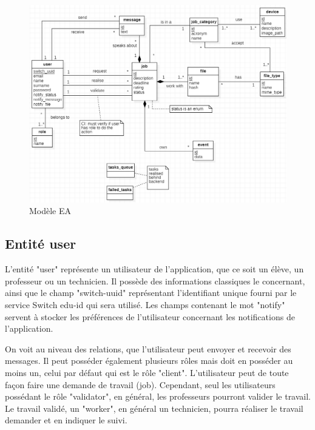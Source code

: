 \documentclass[
    iai, %
    il, %
]{heig-tb}
\begin{document}
\begin{center}
    \begin{figure}
        \includegraphics[width=\textwidth]{./assets/figures/ea.png}
        \caption{Modèle EA \label{ea}}
    \end{figure}
\end{center}

\subsection{Entité user}
L'entité "user" représente un utilisateur de l'application, que ce soit un élève, un professeur ou un technicien.\newline
Il possède des informations classiques le concernant, ainsi que le champ "switch-uuid" représentant l'identifiant unique fourni par le service Switch edu-id qui sera utilisé.\newline
Les champs contenant le mot "notify" servent à stocker les préférences de l'utilisateur concernant les notifications de l'application.

On voit au niveau des relations, que l'utilisateur peut envoyer et recevoir des messages.\newline
Il peut posséder également plusieurs rôles mais doit en posséder au moins un, celui par défaut qui est le rôle "client".\newline
L'utilisateur peut de toute façon faire une demande de travail (job). Cependant, seul les utilisateurs possédant le rôle "validator", en général, les professeurs pourront valider le travail.\newline
Le travail validé, un "worker", en général un technicien, pourra réaliser le travail demander et en indiquer le suivi.
\end{document}
